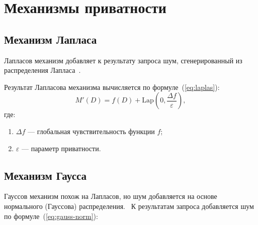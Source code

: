 \section{Механизмы приватности}
\subsection{Механизм Лапласа}

Лапласов механизм добавляет к результату запроса шум, сгенерированный из распределения Лапласа~\cite{db}.



Результат Лапласова механизма вычисляется по формуле~(\ref{eq:laplas}):
\begin{equation}\label{eq:laplas}
	M'(D) = f(D) + \text{Lap}\left(0, \frac{\Delta f}{\varepsilon}\right),
\end{equation}
где:
\begin{enumerate}[label*=---]
	\item $\Delta f$ --- глобальная чувствительность функции $f$;
	\item  $\varepsilon$ --- параметр приватности.
\end{enumerate}



\subsection{Механизм Гаусса}

Гауссов механизм похож на Лапласов, но шум добавляется на основе нормального (Гауссова) распределения.~\cite{db}
К результатам запроса добавляется шум по формуле~(\ref{eq:gauss-norm}):

